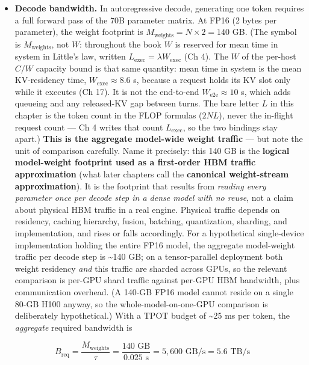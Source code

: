 \begin{itemize}
\tightlist
\item
  \textbf{Decode bandwidth.} In autoregressive decode, generating one
  token requires a full forward pass of the 70B parameter matrix. At
  FP16 (2 bytes per parameter), the weight footprint is
  \(M_\text{weights} = N \times 2 = 140\) GB. (The symbol is
  \(M_\text{weights}\), not \(W\): throughout the book \(W\) is reserved
  for mean time in system in Little's law, written
  \(L_{\mathrm{exec}} = \lambda W_{\mathrm{exec}}\) (Ch 4). The \(W\) of
  the per-host \(C/W\) capacity bound is that same quantity: mean time
  in system is the mean KV-residency time,
  \(W_{\mathrm{exec}} \approx 8.6\) s, because a request holds its KV
  slot only while it executes (Ch 17). It is not the end-to-end
  \(W_{\mathrm{e2e}} \approx 10\) s, which adds queueing and any
  released-KV gap between turns. The bare letter \(L\) in this chapter
  is the token count in the FLOP formulas (\(2NL\)), never the in-flight
  request count --- Ch 4 writes that count \(L_{\mathrm{exec}}\), so the
  two bindings stay apart.) \textbf{This is the aggregate model-wide
  weight traffic} --- but note the unit of comparison carefully. Name it
  precisely: this 140 GB is the \textbf{logical model-weight footprint
  used as a first-order HBM traffic approximation} (what later chapters
  call the \textbf{canonical weight-stream approximation}). It is the
  footprint that results from \emph{reading every parameter once per
  decode step in a dense model with no reuse}, not a claim about
  physical HBM traffic in a real engine. Physical traffic depends on
  residency, caching hierarchy, fusion, batching, quantization,
  sharding, and implementation, and rises or falls accordingly. For a
  hypothetical single-device implementation holding the entire FP16
  model, the aggregate model-weight traffic per decode step is
  \textasciitilde140 GB; on a tensor-parallel deployment both weight
  residency \emph{and} this traffic are sharded across GPUs, so the
  relevant comparison is per-GPU shard traffic against per-GPU HBM
  bandwidth, plus communication overhead. (A 140-GB FP16 model cannot
  reside on a single 80-GB H100 anyway, so the whole-model-on-one-GPU
  comparison is deliberately hypothetical.) With a TPOT budget of
  \textasciitilde25 ms per token, the \emph{aggregate} required
  bandwidth is
\end{itemize}

\[
B_\text{req} = \frac{M_\text{weights}}{\tau} = \frac{140 \text{ GB}}{0.025 \text{ s}} = 5{,}600 \text{ GB/s} = 5.6 \text{ TB/s}
\]

